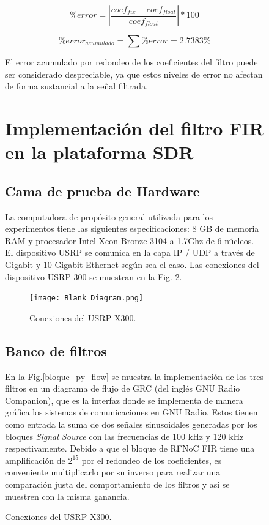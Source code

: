 \documentclass[12pt]{difu100cia} %
\begin{document}
\begin{figure}[!ht]
\begin{equation}
        \% error = | \frac{coef_{fix}-coef_{float}}{coef_{float}}|*100 
        \label{ec_error}  
\end{equation}

\begin{equation}
    \% error_{acumulado}=\sum{\%error}=2.7383\%
    \label{ec_error2}  
\end{equation}

El error acumulado por redondeo de los coeficientes del filtro puede ser considerado despreciable, ya que estos niveles de error no afectan de forma sustancial a la señal filtrada.


\section{Implementación del filtro FIR en la plataforma SDR}
\label{implementacion}

\subsection{Cama de prueba de Hardware}

La computadora de propósito general utilizada para los experimentos tiene las siguientes especificaciones: 8 GB de memoria RAM y procesador Intel Xeon Bronze 3104 a 1.7Ghz de 6 núcleos. El dispositivo USRP se comunica en la capa IP / UDP a través de Gigabit y 10 Gigabit Ethernet según sea el caso. Las conexiones del dispositivo USRP 300 se muestran en la Fig. \ref{bloque_connexiones}.  

\begin{figure}[!htb]
	\centering
	\texttt{[image: Blank\_Diagram.png]}
	\caption{Conexiones del USRP X300.}
	\label{bloque_connexiones}
\end{figure}

\subsection{Banco de filtros}

En la Fig.\ref{bloque_py_flow} se muestra la implementación de los tres filtros en un diagrama de flujo de GRC (del inglés GNU Radio Companion), que es la interfaz donde se implementa de manera gráfica los sistemas de comunicaciones en GNU Radio. Estos tienen como entrada la suma de dos señales sinusoidales generadas por los bloques \textit{Signal Source} con las frecuencias de 100 kHz y 120 kHz respectivamente. Debido a que el bloque de RFNoC FIR tiene una amplificación de $2^{15}$ por el redondeo de los coeficientes, es conveniente multiplicarlo por su inverso para realizar una comparación justa del comportamiento de los filtros y así se muestren con la misma ganancia.        


\end{figure}
\end{document}
